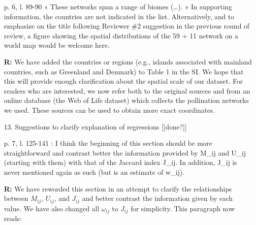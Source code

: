\documentclass[12pt]{letter}
\newenvironment{refquote}{\bigskip \begin{it}}{\end{it}\smallskip}
\begin{document}
		\begin{refquote}
			p. 6, l. 89-90 « These networks span a range of biomes (…). » In supporting information, the countries are not indicated in the list. Alternatively, and to emphasize on the title following Reviewer \#2 suggestion in the previous round of review, a figure showing the spatial distributions of the 59 + 11 network on a world map would be welcome here.
		\end{refquote}


		\textbf{R:} We have added the countries or regions (e.g., islands associated with mainland countries, such as Greenland and Denmark) to Table 1 in the SI. We hope that this will provide enough clarification about the spatial scale of our dataset. For readers who are interested, we now refer both to the original sources and from an online database (the Web of Life dataset) which collects the pollination networks we used. These sources can be used to obtain more exact coordinates. 


	13. Suggestions to clarify explanation of regressions [[done?]]

		\begin{refquote}
			p. 7, l. 125-141 : I think the beginning of this section should be more straightforward and contrast better the information provided by M\_ij and U\_ij (starting with them) with that of the Jaccard index J\_ij. In addition, J\_ij is never mentioned again as such (but is an estimate of w\_ij).
		\end{refquote}


		\textbf{R:} We have reworded this section in an attempt to clarify the relationships between $M_{ij}$, $U_{ij}$, and $J_{ij}$ and better contrast the information given by each value. We have also changed all $\omega_{ij}$ to $J_{ij}$ for simplicity. This paragraph now reads:
\end{document}
